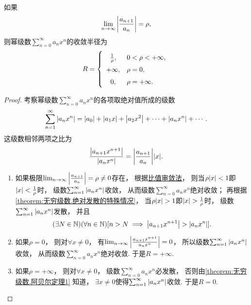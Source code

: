 \begin{theorem}\label{theorem:无穷级数.幂级数的收敛半径的求法2}
如果\begin{equation*}
	\lim_{n\to\infty} \abs{\frac{a_{n+1}}{a_n}} = \rho,
\end{equation*}
则幂级数\(\sum_{n=0}^\infty a_n x^n\)的收敛半径为\begin{equation*}
	R = \left\{ \def\arraystretch{1.5} \begin{array}{cl}
		\frac1\rho, & 0<\rho<+\infty, \\
		+\infty, & \rho = 0, \\
		0, & \rho = +\infty. \\
	\end{array} \right.
\end{equation*}
\begin{proof}
考察幂级数\(\sum_{n=0}^\infty a_n x^n\)的各项取绝对值所成的级数\begin{equation*}
	\sum_{n=1}^\infty \abs{a_n x^n}
	= \abs{a_0} + \abs{a_1 x} + \abs{a_2 x^2} + \dotsb + \abs{a_n x^n} + \dotsb.
\end{equation*}
这级数相邻两项之比为\begin{equation*}
	\frac{\abs{a_{n+1} x^{n+1}}}{\abs{a_n x^n}}
	= \abs{\frac{a_{n+1}}{a_n}} \abs{x}.
\end{equation*}

\begin{enumerate}
	\item 如果极限\(\lim_{n\to\infty} \abs{\frac{a_{n+1}}{a_n}} = \rho\neq0\)存在，
	根据\hyperref[theorem:无穷级数.正项级数的比值审敛法]{比值审敛法}，
	则当\(\rho \abs{x} < 1\)即\(\abs{x} < \frac1\rho\)时，
	级数\(\sum_{n=1}^\infty \abs{a_n x^n}\)收敛，
	从而级数\(\sum_{n=0}^\infty a_n x^n\)绝对收敛；
	再根据\cref{theorem:无穷级数.绝对发散的特殊情况}，
	当\(\rho \abs{x} > 1\)即\(\abs{x} > \frac1\rho\)时，
	级数\(\sum_{n=1}^\infty \abs{a_n x^n}\)发散，
	并且\begin{equation*}
		(\exists N\in\mathbb{N})
		(\forall n\in\mathbb{N})
		[
			n > N
			\implies
			\abs{a_{n+1} x^{n+1}} > \abs{a_n x^n}
		].
	\end{equation*}

	\item 如果\(\rho=0\)，
	则对\(\forall x\neq0\)，
	有\(\lim_{n\to\infty} \abs{\frac{a_{n+1} x^{n+1}}{a_n x^n}} = 0\)，
	所以级数\(\sum_{n=1}^\infty \abs{a_n x^n}\)收敛，
	从而级数\(\sum_{n=0}^\infty a_n x^n\)绝对收敛.
	于是\(R=+\infty\).
		\item 如果\(\rho=+\infty\)，
	则对\(\forall x\neq0\)，
	级数\(\sum_{n=0}^\infty a_n x^n\)必发散，
	否则由\cref{theorem:无穷级数.阿贝尔定理1} 知道，
	\(\exists x\neq0\)使得\(\sum_{n=1}^\infty \abs{a_n x^n}\)收敛.
	于是\(R=0\).
	\qedhere
\end{enumerate}
\end{proof}
\end{theorem}
